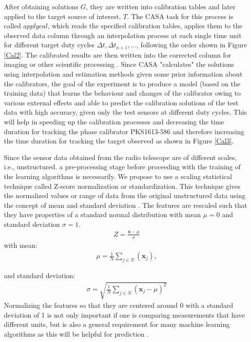 After obtaining solutions $G$, they are written into calibration tables and later applied to the target source of interest, $T$. The CASA task for this process is called $\textit{applycal}$, which reads the specified calibration tables, applies them to the observed data column through an interpolation process at each single time unit for different target duty cycles $\Delta t, \Delta t_{n+1},\dots$, following the order shown in Figure \ref{Cal2}. The calibrated results are then written into the corrected column for imaging or other scientific processing \citep{ott2013casa}. Since CASA "calculates" the solutions using interpolation and estimation methods given some prior information about the calibrators, the goal of the experiment is to produce a model (based on the training data) that learns the behaviour and changes of the calibrator owing to various external effects and able to predict the calibration solutions of the test data with high accuracy, given only the test sensors at different duty cycles. This will help in speeding up the calibration processes and decreasing the time duration for tracking the phase calibrator PKS1613-586 and therefore increasing the time duration for tracking the target observed as shown in Figure \ref{Cal3}. 

Since the sensor data obtained from the radio telescope are of different scales, i.e., unstructured. a pre-processing stage before proceeding with the training of the learning algorithms is necessarily. We propose to use a scaling statistical technique called Z-score normalization or standardization. This technique gives the normalized values or range of data from the original unstructured data using the concept of mean and standard deviation \citep{patro2015normalization}. The features are rescaled such that they have properties of a standard normal distribution with mean $\mu=0$ and standard deviation $\sigma=1$. 
\begin{align}
Z=\frac{\textbf{x}- \mu}{\sigma}
\end{align}
with mean:
\begin{align*}
\mu= \frac{1}{N} \sum_{j\in N} (\textbf{x}_j),
\end{align*}

and standard deviation:
\begin{align*}
\sigma=\sqrt{ \frac{1}{N} \sum_{j\in N} (\textbf{x}_j-\mu )^2}
\end{align*}
Normalizing the features so that they are centered around 0 with a standard deviation of 1 is not only important if one is comparing measurements that have different units, but is also a general requirement for many machine learning algorithms as this will be helpful for prediction \citep{bott2014feature}.

